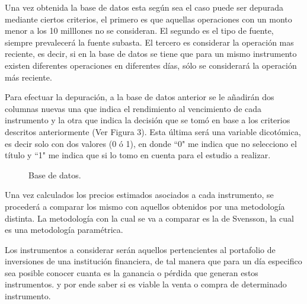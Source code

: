 \hspace{0.4cm} Una vez obtenida la base de datos esta seg\'un sea el caso puede ser depurada mediante ciertos criterios, el primero es que aquellas operaciones con un monto menor a los 10 milllones no se consideran. El segundo es el tipo de fuente, siempre prevalecer\'a la fuente subasta. El tercero es considerar la operaci\'on mas reciente, es decir, si en la base de datos se tiene que para un mismo instrumento existen diferentes operaciones en diferentes d\'ias, s\'olo se considerar\'a la operaci\'on m\'as reciente.


\hspace{0.4cm} Para efectuar la depuraci\'on, a la base de datos anterior se le a\~nadir\'an dos columnas nuevas una que indica el rendimiento al vencimiento de cada instrumento y la otra que indica la decisi\'on que se tom\'o en base a los criterios descritos anteriormente (Ver Figura 3). Esta \'ultima ser\'a una variable dicot\'omica, es decir solo con dos valores (0 \'o 1), en donde ``0" me indica que no selecciono el t\'itulo y ``1" me indica que si lo tomo en cuenta para el estudio a realizar.

\begin{figure}[h]
\caption{Base de datos.}
\label{base_datos}
\end{figure}


\hspace{0.4cm} Una vez calculados los precios estimados asociados a cada instrumento, se proceder\'a a comparar los mismo con aquellos obtenidos por una metodolog\'ia distinta. La metodolog\'ia con la cual se va a comparar es la de Svensson, la cual es una metodolog\'ia param\'etrica.



\hspace{0.4cm} Los instrumentos a considerar ser\'an aquellos pertencientes al portafolio de inversiones de una instituci\'on financiera, de tal manera que para un d\'ia especifico sea posible conocer cuanta es la ganancia o p\'erdida que generan estos instrumentos. y por ende saber si es viable la venta o compra de determinado instrumento.


